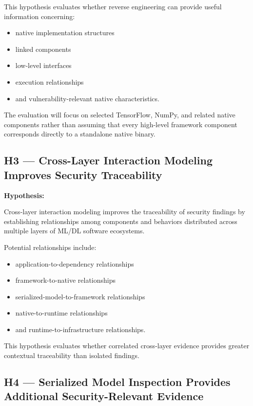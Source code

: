 \documentclass[
  12pt,
  letterpaper,
  oneside]{report}
\providecommand{\tightlist}{%
  \setlength{\itemsep}{0pt}\setlength{\parskip}{0pt}}
\begin{document}
This hypothesis evaluates whether reverse engineering can provide useful
information concerning:

\begin{itemize}
\tightlist
\item
  native implementation structures
\item
  linked components
\item
  low-level interfaces
\item
  execution relationships
\item
  and vulnerability-relevant native characteristics.
\end{itemize}

The evaluation will focus on selected TensorFlow, NumPy, and related
native components rather than assuming that every high-level framework
component corresponds directly to a standalone native binary.

\subsection{H3 --- Cross-Layer Interaction Modeling Improves Security
Traceability}\label{h3--cross-layer-interaction-modeling-improves-security-traceability}

\textbf{Hypothesis:}

Cross-layer interaction modeling improves the traceability of security
findings by establishing relationships among components and behaviors
distributed across multiple layers of ML/DL software ecosystems.

Potential relationships include:

\begin{itemize}
\tightlist
\item
  application-to-dependency relationships
\item
  framework-to-native relationships
\item
  serialized-model-to-framework relationships
\item
  native-to-runtime relationships
\item
  and runtime-to-infrastructure relationships.
\end{itemize}

This hypothesis evaluates whether correlated cross-layer evidence
provides greater contextual traceability than isolated findings.

\subsection{H4 --- Serialized Model Inspection Provides Additional
Security-Relevant
Evidence}\label{h4--serialized-model-inspection-provides-additional-security-relevant-evidence}
\end{document}
